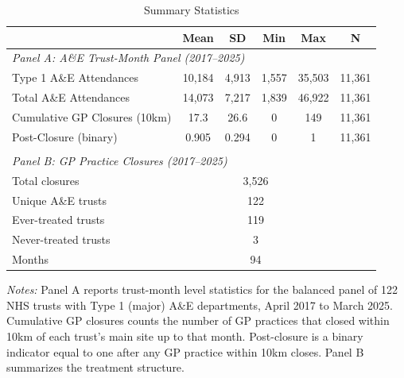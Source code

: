 \begin{table}[htbp]
\centering
\caption{Summary Statistics}
\label{tab:summary}
\begin{tabular}{lccccc}
\hline\hline
 & Mean & SD & Min & Max & N \\
\hline
\multicolumn{6}{l}{\textit{Panel A: A\&E Trust-Month Panel (2017--2025)}} \\[4pt]
Type 1 A\&E Attendances & 10,184 & 4,913 & 1,557 & 35,503 & 11,361 \\
Total A\&E Attendances & 14,073 & 7,217 & 1,839 & 46,922 & 11,361 \\
Cumulative GP Closures (10km) & 17.3 & 26.6 & 0 & 149 & 11,361 \\
Post-Closure (binary) & 0.905 & 0.294 & 0 & 1 & 11,361 \\
\\
\multicolumn{6}{l}{\textit{Panel B: GP Practice Closures (2017--2025)}} \\[4pt]
Total closures & \multicolumn{4}{c}{3,526} & \\
Unique A\&E trusts & \multicolumn{4}{c}{122} & \\
Ever-treated trusts & \multicolumn{4}{c}{119} & \\
Never-treated trusts & \multicolumn{4}{c}{3} & \\
Months & \multicolumn{4}{c}{94} & \\
\hline\hline
\end{tabular}
\begin{tablenotes}[flushleft]
\small
\item \textit{Notes:} Panel A reports trust-month level statistics for the balanced panel of 122 NHS trusts with Type 1 (major) A\&E departments, April 2017 to March 2025. Cumulative GP closures counts the number of GP practices that closed within 10km of each trust's main site up to that month. Post-closure is a binary indicator equal to one after any GP practice within 10km closes. Panel B summarizes the treatment structure.
\end{tablenotes}
\end{table}
